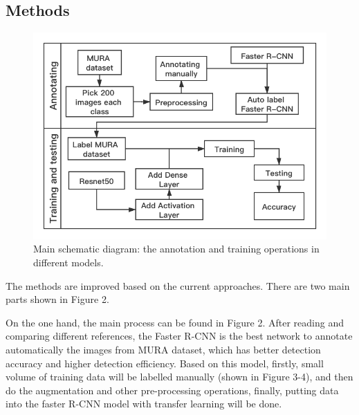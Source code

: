 \documentclass[12pt,oneside,a4paper]{article}
\begin{document}
\subsection{Methods}

\begin{figure}
\begin{center}
\includegraphics[width=1\columnwidth]{images/architecture.png}
\caption{Main schematic diagram: the annotation and training operations in different models.}
\end{center}
\end{figure}

The methods are improved based on the current approaches. There are two main parts shown in Figure 2. 

On the one hand, the main process can be found in Figure 2. After reading and comparing different references, the Faster R-CNN is the best network to annotate automatically the images from MURA dataset, which has better detection accuracy and higher detection efficiency. Based on this model, firstly, small volume of training data will be labelled manually (shown in Figure 3-4), and then do the augmentation and other pre-processing operations, finally, putting data into the faster R-CNN model with transfer learning will be done. 
\end{document}
